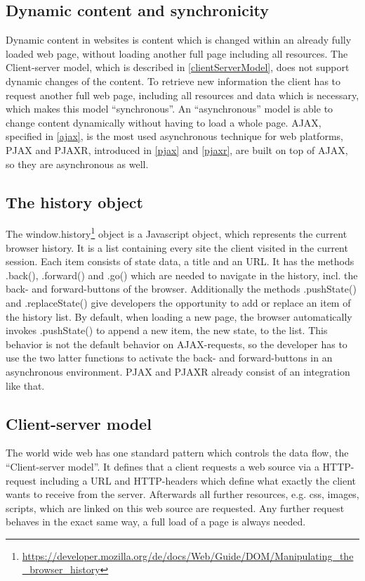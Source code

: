 \documentclass[f,bachelor,binding,twoside,palatino]{WeSTthesis}
\def \ajax {AJAX}
\def \pjax {PJAX}
\def \pjaxr {PJAXR}
\def \httpRequest {HTTP-request}
\begin{document}
    \subsection{Dynamic content and synchronicity}
      Dynamic content in websites is content which is changed within an already fully loaded web page, without loading another full page including all resources. 
      The Client-server model, which is described in \ref{clientServerModel}, does not support dynamic changes of the content. 
      To retrieve new information the client has to request another full web page, including all resources and data which is necessary, which makes this model \enquote{synchronous}.
      An \enquote{asynchronous} model is able to change content dynamically without having to load a whole page. \ajax{}, specified in \ref{ajax}, is the most used asynchronous technique for web platforms, \pjax{} and \pjaxr{}, introduced in \ref{pjax} and \ref{pjaxr}, are built on top of \ajax{}, so they are asynchronous as well.
      

      \subsection{The history object\label{theHistoryObject}}
      The window.history\footnote{\url{https://developer.mozilla.org/de/docs/Web/Guide/DOM/Manipulating_the_browser_history}} object is a Javascript object, which represents the current browser history.
      It is a list containing every site the client visited in the current session.
      Each item consists of state data, a title and an URL.
      It has the methods .back(), .forward() and .go() which are needed to navigate in the history, incl.  the back- and forward-buttons of the browser.
      Additionally the methods .pushState() and .replaceState() give developers the opportunity to add or replace an item of the history list.
      By default, when loading a new page, the browser automatically invokes .pushState() to append a new item, the new state, to the list.
      This behavior is not the default behavior on \ajax-requests, so the developer has to use the two latter functions to activate the back- and forward-buttons in an asynchronous environment. \pjax{} and \pjaxr{} already consist of an integration like that.


  \subsection{Client-server model\label{clientServerModel}}
    The world wide web has one standard pattern which controls the data flow, the \enquote{Client-server model}.
    It defines that a client requests a web source via a \httpRequest{} including a URL and HTTP-headers which define what exactly the client wants to receive from the server.
    Afterwards all further resources, e.g. css, images, scripts, which are linked on this web source are requested.
    Any further request behaves in the exact same way, a full load of a page is always needed.
\end{document}
